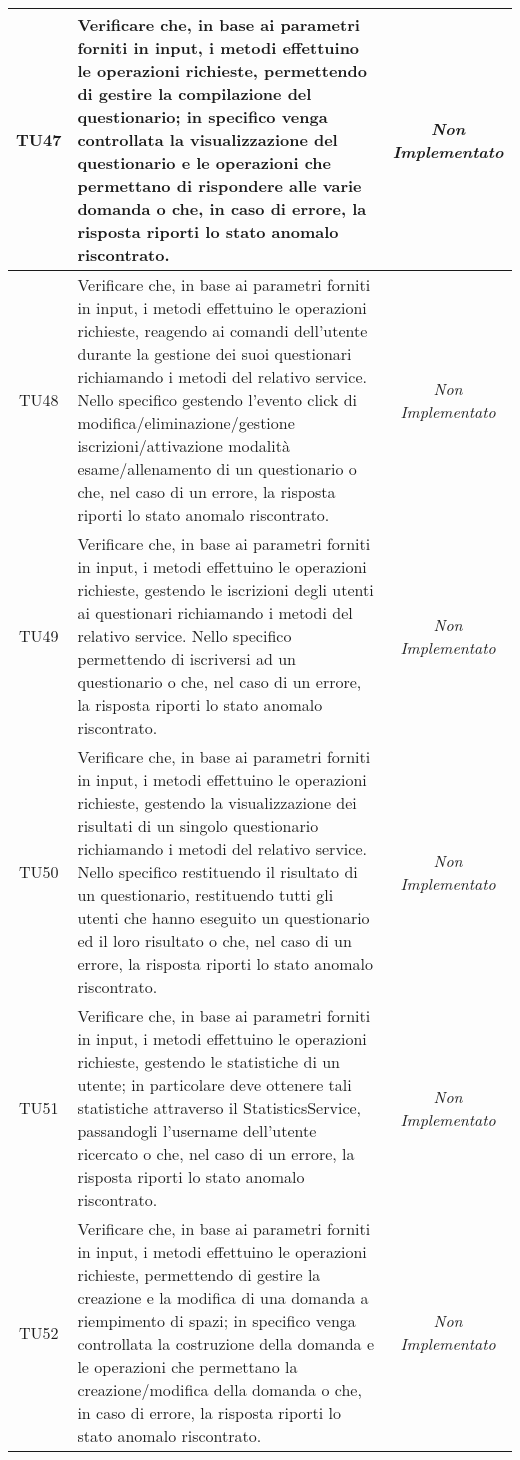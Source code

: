 \begin{longtable}{|c|>{}m{10cm}|c|}
\hypertarget{TU47}{TU47} & Verificare che, in base ai parametri forniti in input, i metodi effettuino le operazioni richieste, permettendo di gestire la compilazione del questionario; in specifico venga controllata la visualizzazione del questionario e le operazioni che permettano di rispondere alle varie domanda o che, in caso di errore, la risposta riporti lo stato anomalo riscontrato. & \textit{Non Implementato}\\ \hline
\hypertarget{TU48}{TU48} & Verificare che, in base ai parametri forniti in input, i metodi effettuino le operazioni richieste, reagendo ai comandi dell'utente durante la gestione dei suoi questionari richiamando i metodi del relativo service. Nello specifico gestendo l'evento click di modifica/eliminazione/gestione iscrizioni/attivazione modalità esame/allenamento di un questionario o che, nel caso di un errore, la risposta riporti lo stato anomalo riscontrato. & \textit{Non Implementato}\\ \hline
\hypertarget{TU49}{TU49} & Verificare che, in base ai parametri forniti in input, i metodi effettuino le operazioni richieste, gestendo le iscrizioni degli utenti ai questionari richiamando i metodi del relativo service. Nello specifico permettendo di iscriversi ad un questionario o che, nel caso di un errore, la risposta riporti lo stato anomalo riscontrato. & \textit{Non Implementato}\\ \hline
\hypertarget{TU50}{TU50} & Verificare che, in base ai parametri forniti in input, i metodi effettuino le operazioni richieste, gestendo la visualizzazione dei risultati di un singolo questionario richiamando i metodi del relativo service. Nello specifico restituendo il risultato di un questionario, restituendo tutti gli utenti che hanno eseguito un questionario ed il loro risultato o che, nel caso di un errore, la risposta riporti lo stato anomalo riscontrato. & \textit{Non Implementato}\\ \hline
\hypertarget{TU51}{TU51} & Verificare che, in base ai parametri forniti in input, i metodi effettuino le operazioni richieste, gestendo le statistiche di un utente; in particolare deve ottenere tali statistiche attraverso il StatisticsService, passandogli l'username dell'utente ricercato o che, nel caso di un errore, la risposta riporti lo stato anomalo riscontrato. & \textit{Non Implementato}\\ \hline
\hypertarget{TU52}{TU52} & Verificare che, in base ai parametri forniti in input, i metodi effettuino le operazioni richieste, permettendo di gestire la creazione e la modifica di una domanda a riempimento di spazi; in specifico venga controllata la costruzione della domanda e le operazioni che permettano la creazione/modifica della domanda o che, in caso di errore, la risposta riporti lo stato anomalo riscontrato. & \textit{Non Implementato}\\ \hline

\end{longtable}
